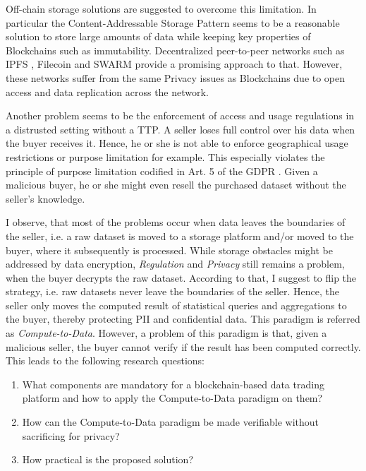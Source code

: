 Off-chain storage solutions are suggested to overcome this limitation. In particular the Content-Addressable Storage Pattern \cite{eberhardtBlockchainInsightsOffChaining2017} seems to be a reasonable solution to store large amounts of data while keeping key properties of Blockchains such as immutability. Decentralized peer-to-peer networks such as IPFS \cite{benetIPFSContentAddressed2014}, Filecoin \cite{filecoin} and SWARM \cite{swarm} provide a promising approach to that. However, these networks suffer from the same Privacy issues as Blockchains due to open access and data replication across the network.

Another problem seems to be the enforcement of access and usage regulations in a distrusted setting without a TTP. A seller loses full control over his data when the buyer receives it. Hence, he or she is not able to enforce geographical usage restrictions or purpose limitation for example. This especially violates the principle of purpose limitation codified in Art. 5 of the GDPR \cite[Art. 5 (1 b)]{european_commission_regulation_2016}. Given a malicious buyer, he or she might even resell the purchased dataset without the seller's knowledge.

\noindent I observe, that most of the problems occur when data leaves the boundaries of the seller, i.e. a raw dataset is moved to a storage platform and/or moved to the buyer, where it subsequently is processed. While storage obstacles might be addressed by data encryption, \emph{Regulation} and \emph{Privacy} still remains a problem, when the buyer decrypts the raw dataset. According to that, I suggest to flip the strategy, i.e. raw datasets never leave the boundaries of the seller. Hence, the seller only moves the computed result of statistical queries and aggregations to the buyer, thereby protecting PII and confidential data. This paradigm is referred as \emph{Compute-to-Data}. However, a problem of this paradigm is that, given a malicious seller, the buyer cannot verify if the result has been computed correctly. This leads to the following research questions:


\begin{enumerate}
    \item What components are mandatory for a blockchain-based data trading platform and how to apply the Compute-to-Data paradigm on them?
    \item How can the Compute-to-Data paradigm be made verifiable without sacrificing for privacy?
    \item How practical is the proposed solution?
\end{enumerate}